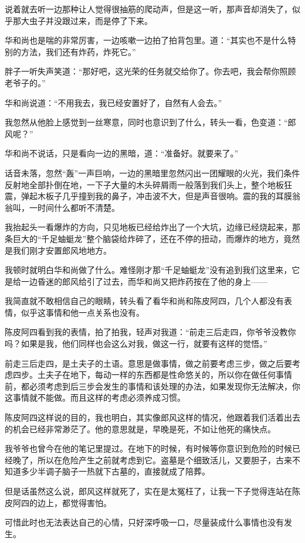说着就去听一边那种让人觉得很抽筋的爬动声，但是这一听，那声音却消失了，似乎那大虫子并没跟过来，而是停了下来。

华和尚也是喘的非常厉害，一边咳嗽一边拍了拍背包里。道：“其实也不是什么特别的方法，我们还有炸药，炸死它。”

胖子一听失声笑道：“那好吧，这光荣的任务就交给你了。你去吧，我会帮你照顾老爷子的。”

华和尚说道：“不用我去，我已经安置好了，自然有人会去。”

我忽然从他脸上感觉到一丝寒意，同时也意识到了什么，转头一看，色变道：“郎风呢？”

华和尚不说话，只是看向一边的黑暗，道：“准备好。就要来了。”

话音未落，忽然“轰”一声巨响，一边的黑暗里忽然闪出一团耀眼的火光，我们条件反射地全部扑倒在地，一下子大量的木头碎屑雨一般落到我们头上，整个地板狂震，弹起木板子几乎撞到我的鼻子，冲击波不大，但是声音很响。震的我的耳膜翁翁叫，一时间什么都听不清楚。

我抬起头一看爆炸的方向，只见地板已经给炸出了一个大坑，边缘已经烧起来，那条巨大的“千足蚰蜓龙”整个脑袋给炸碎了，还在不停的扭动，而爆炸的地方，竟然是我们刚才安置郎风地地方。

我顿时就明白华和尚做了什么。难怪刚才那“千足蚰蜓龙”没有追到我们这里来，它是给一边昏迷的郎风给引了过去，而华和尚又把炸药按在了他的身上——

我简直就不敢相信自己的眼睛，转头看了看华和尚和陈皮阿四，几个人都没有表情，似乎这事情和他一点关系也没有。

陈皮阿四看到我的表情，拍了拍我，轻声对我道：“前走三后走四，你爷爷没教你吗？如果是我，他们同样也会这么对我，做这一行，就要有这样的觉悟。”

前走三后走四，是土夫子的土语。意思是做事情，做之前要考虑三步，做之后要考虑四步。土夫子在地下，每动一样的东西都是性命悠关的，所以你在做任何事情前，都必须考虑到后三步会发生的事情和该处理的办法，如果发现你无法解决，你这事情就不能做。而且这样的考虑必须养成习惯。

陈皮阿四这样说的目的，我也明白，其实像郎风这样的情况，他跟着我们活着出去的机会已经非常渺茫了。他的意思就是，早晚是死，不如让他死的痛快点。

我爷爷也曾今在他的笔记里提过。在地下的时候，有时候等你意识到危险的时候已经晚了，所以在危险产生之前就考虑到它。盗墓是个细致活儿，又要胆子，古来不知道多少半调子脑子一热就下古墓的，直接就成了陪葬。

但是话虽然这么说，郎风这样就死了，实在是太冤枉了，让我一下子觉得连站在陈皮阿四的边上，都觉得害怕。

可惜此时也无法表达自己的心情，只好深呼吸一口，尽量装成什么事情也没有发生。

